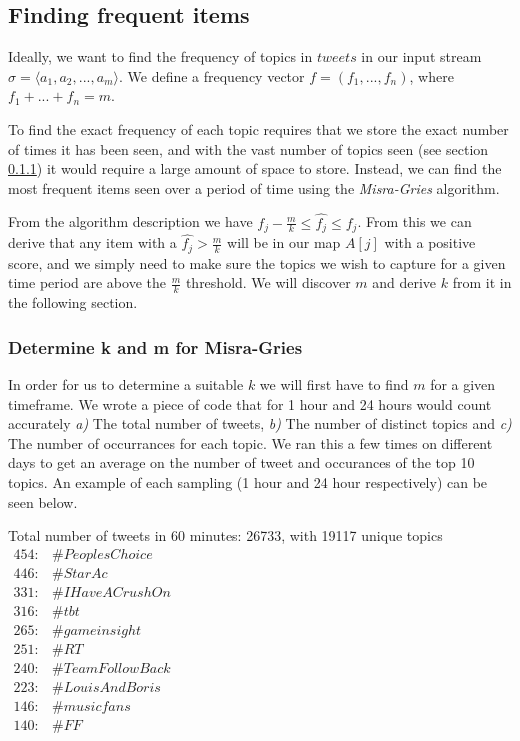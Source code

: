 \subsection{Finding frequent items}\label{algo-frequent}
Ideally, we want to find the frequency of topics in $tweets$ in our input stream $\sigma = \langle a_{1}, a_{2},...,a_{m}\rangle$. We define a frequency vector $f = (f_{1},...,f_{n})$, where $f_{1} + ... + f_{n} = m$. 

To find the exact frequency of each topic requires that we store the exact number of times it has been seen, and with the vast number of topics seen (see section \ref{frequent-determine}) it would require a large amount of space to store. Instead, we can find the most frequent items seen over a period of time using the \textit{Misra-Gries} algorithm.\cite{Amit}
\newline

From the algorithm description we have $f_j - \frac{m}{k} \leq \hat{f_j} \leq f_j$. From this we can derive that any item with a $\hat{f_j} > \frac{m}{k}$ will be in our map $A[j]$ with a positive score, and we simply need to make sure the topics we wish to capture for a given time period are above the $\frac{m}{k}$ threshold. We will discover $m$ and derive $k$ from it in the following section.

\subsubsection{Determine k and m for Misra-Gries}
\label{frequent-determine}
In order for us to determine a suitable $k$ we will first have to find $m$ for a given timeframe. We wrote a piece of code that for 1 hour and 24 hours would count accurately \textit{a)} The total number of tweets, \textit{b)} The number of distinct topics and \textit{c)} The number of occurrances for each topic. We ran this a few times on different days to get an average on the number of tweet and occurances of the top 10 topics. An example of each sampling (1 hour and 24 hour respectively) can be seen below.\newline

Total number of tweets in 60 minutes: 26733, with 19117 unique topics\\

$\begin{array}{ll}
    454: & \#PeoplesChoice \\
    446: & \#StarAc \\
    331: & \#IHaveACrushOn \\
    316: & \#tbt \\
    265: & \#gameinsight \\
    251: & \#RT \\
    240: & \#TeamFollowBack \\
    223: & \#LouisAndBoris \\
    146: & \#musicfans \\
    140: & \#FF \\
\end{array}$
\\
\\

